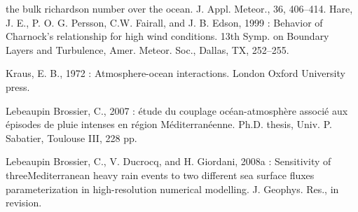 \begin{description}
the bulk richardson number over the ocean. J. Appl. Meteor., 36, 406–414.
Hare, J. E., P. O. G. Persson, C.W. Fairall, and J. B. Edson, 1999 : Behavior of Charnock’s relationship
for high wind conditions. 13th Symp. on Boundary Layers and Turbulence, Amer. Meteor. Soc.,
Dallas, TX, 252–255.
\item
Kraus, E. B., 1972 : Atmosphere-ocean interactions. London Oxford University press.
\item
Lebeaupin Brossier, C., 2007 : \'etude du couplage oc\'ean-atmosph\`ere associ\'e aux \'episodes de pluie
intenses en r\'egion M\'editerran\'eenne. Ph.D. thesis, Univ. P. Sabatier, Toulouse III, 228 pp.
\item
Lebeaupin Brossier, C., V. Ducrocq, and H. Giordani, 2008a : Sensitivity of threeMediterranean heavy
rain events to two different sea surface fluxes parameterization in high-resolution numerical modelling.
J. Geophys. Res., in revision.

\end{description}

